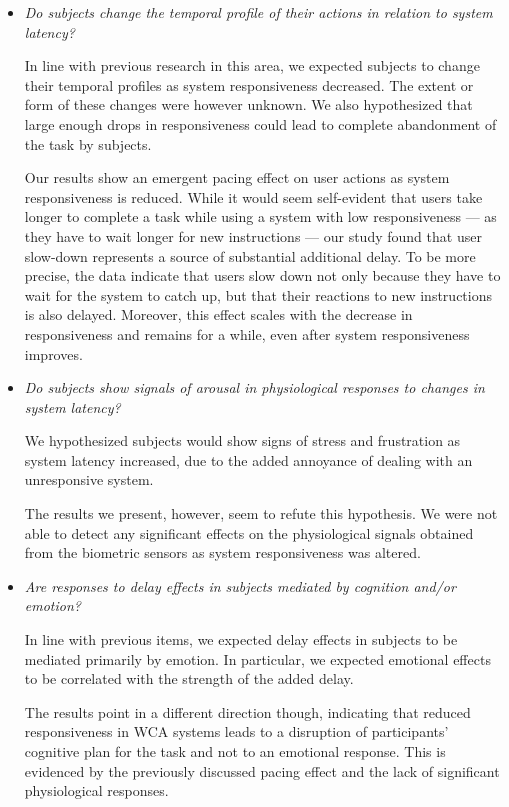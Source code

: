 \begin{itemize}
    \item \emph{Do subjects change the temporal profile of their actions in relation to system latency?}

          In line with previous research in this area, we expected subjects to change their temporal profiles as system responsiveness decreased.
          The extent or form of these changes were however unknown.
          We also hypothesized that large enough drops in responsiveness could lead to complete abandonment of the task by subjects.

          Our results show an emergent pacing effect on user actions as system responsiveness is reduced.
          While it would seem self-evident that users take longer to complete a task while using a system with low responsiveness --- as they have to wait longer for new instructions --- our study found that user slow-down represents a source of substantial additional delay.
          To be more precise, the data indicate that users slow down not only because they have to wait for the system to catch up, but that their reactions to new instructions is also delayed.
          Moreover, this effect scales with the decrease in responsiveness and remains for a while, even after system responsiveness improves.

    \item \emph{Do subjects show signals of arousal in physiological responses to changes in system latency?}

          We hypothesized subjects would show signs of stress and frustration as system latency increased, due to the added annoyance of dealing with an unresponsive system.

          The results we present, however, seem to refute this hypothesis.
          We were not able to detect any significant effects on the physiological signals obtained from the biometric sensors as system responsiveness was altered.

    \item \emph{Are responses to delay effects in subjects mediated by cognition and/or emotion?}

          In line with previous items, we expected delay effects in subjects to be mediated primarily by emotion.
          In particular, we expected emotional effects to be correlated with the strength of the added delay.

          The results point in a different direction though, indicating that reduced responsiveness in WCA systems leads to a disruption of participants' cognitive plan for the task and not to an emotional response.
          This is evidenced by the previously discussed pacing effect and the lack of significant physiological responses.


\end{itemize}
